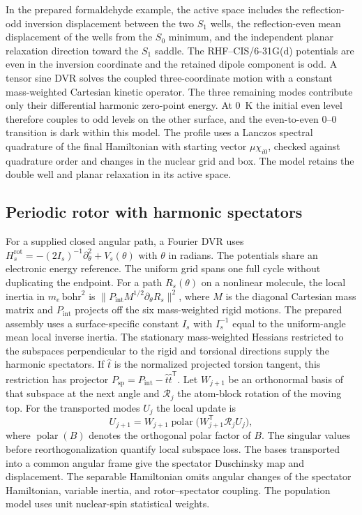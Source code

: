 In the prepared formaldehyde example, the active space includes the
reflection-odd inversion displacement between the two $S_1$ wells, the
reflection-even mean displacement of the wells from the $S_0$ minimum,
and the independent planar relaxation direction toward the $S_1$ saddle.
The RHF--CIS/6-31G(d) potentials are even in the inversion coordinate and
the retained dipole component is odd. A tensor sine DVR solves the coupled
three-coordinate motion with a constant mass-weighted Cartesian kinetic
operator. The three remaining modes contribute only their differential
harmonic zero-point energy. At 0~K the initial even level therefore
couples to odd levels on the other surface, and the even-to-even 0--0
transition is dark within this model. The profile uses a Lanczos spectral
quadrature of the final Hamiltonian with starting vector
$\mu\chi_{i0}$, checked against quadrature order and changes in the nuclear
grid and box. The model retains the double well and planar relaxation
in its active space.

\subsection{Periodic rotor with harmonic spectators}

For a supplied closed angular path, a Fourier DVR uses
$H_s^{\mathrm{rot}}=-(2I_s)^{-1}\partial_\theta^2+V_s(\theta)$ with $\theta$
in radians. The potentials share an electronic energy reference. The
uniform grid spans one full cycle without duplicating the endpoint. For
a path $R_s(\theta)$ on a nonlinear molecule, the local inertia in
$m_e\,\mathrm{bohr}^2$ is $\|P_{\mathrm{int}}M^{1/2}\partial_\theta R_s\|^2$,
where $M$ is the diagonal Cartesian mass matrix and $P_{\mathrm{int}}$
projects off the six mass-weighted rigid motions. The prepared assembly
uses a surface-specific constant $I_s$ with $I_s^{-1}$ equal to the
uniform-angle mean local inverse inertia. The stationary mass-weighted
Hessians restricted to the subspaces perpendicular to the rigid and
torsional directions supply the harmonic spectators. If $\hat t$ is
the normalized projected torsion tangent, this restriction has projector
$P_{\mathrm{sp}}=P_{\mathrm{int}}-\hat t\hat t^{\mathsf T}$.
Let $W_{j+1}$ be an orthonormal basis of that subspace at the next angle
and $\mathcal R_j$ the atom-block rotation of the moving top. For the
transported modes $U_j$ the local update is
\begin{equation}
 U_{j+1}=W_{j+1}\operatorname{polar}
          \bigl(W_{j+1}^{\mathsf T}\mathcal R_j U_j\bigr),
 \label{eq:transport}
\end{equation}
where $\operatorname{polar}(B)$ denotes the orthogonal polar factor of $B$.
The singular values before reorthogonalization quantify local subspace
loss. The bases transported into a common angular frame give the spectator
Duschinsky map and displacement.
The separable Hamiltonian omits angular changes of the spectator
Hamiltonian, variable inertia, and rotor--spectator coupling.
The population model uses unit nuclear-spin statistical weights.\cite{hybriddvr}

